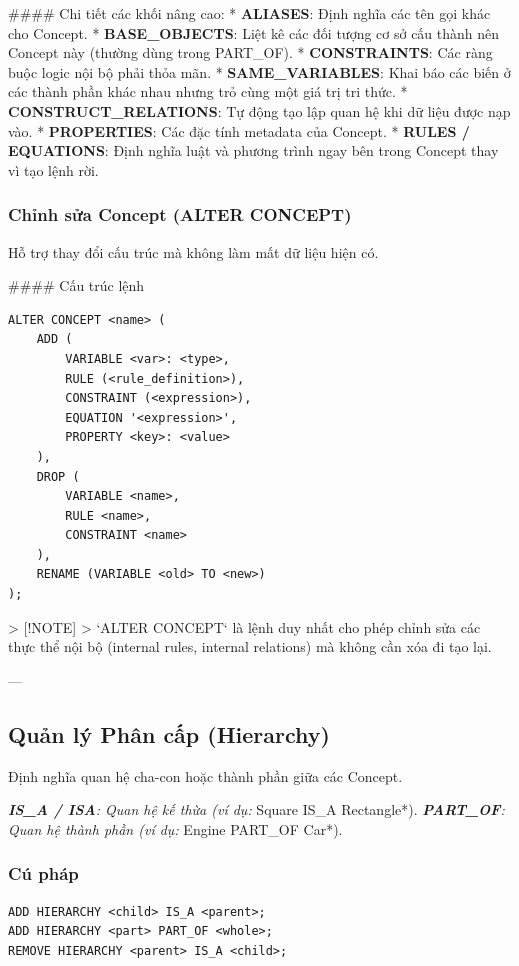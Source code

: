 \#\#\#\# Chi tiết các khối nâng cao:
*   \textbf{ALIASES}: Định nghĩa các tên gọi khác cho Concept.
*   \textbf{BASE\_OBJECTS}: Liệt kê các đối tượng cơ sở cấu thành nên Concept này (thường dùng trong PART\_OF).
*   \textbf{CONSTRAINTS}: Các ràng buộc logic nội bộ phải thỏa mãn.
*   \textbf{SAME\_VARIABLES}: Khai báo các biến ở các thành phần khác nhau nhưng trỏ cùng một giá trị tri thức.
*   \textbf{CONSTRUCT\_RELATIONS}: Tự động tạo lập quan hệ khi dữ liệu được nạp vào.
*   \textbf{PROPERTIES}: Các đặc tính metadata của Concept.
*   \textbf{RULES / EQUATIONS}: Định nghĩa luật và phương trình ngay bên trong Concept thay vì tạo lệnh rời.

\subsubsection{Chỉnh sửa Concept (ALTER CONCEPT)}
Hỗ trợ thay đổi cấu trúc mà không làm mất dữ liệu hiện có.

\#\#\#\# Cấu trúc lệnh
\begin{verbatim}
ALTER CONCEPT <name> (
    ADD (
        VARIABLE <var>: <type>,
        RULE (<rule_definition>),
        CONSTRAINT (<expression>),
        EQUATION '<expression>',
        PROPERTY <key>: <value>
    ),
    DROP (
        VARIABLE <name>,
        RULE <name>,
        CONSTRAINT <name>
    ),
    RENAME (VARIABLE <old> TO <new>)
);
\end{verbatim}

> [!NOTE]
> `ALTER CONCEPT` là lệnh duy nhất cho phép chỉnh sửa các thực thể nội bộ (internal rules, internal relations) mà không cần xóa đi tạo lại.

---

\subsection{Quản lý Phân cấp (Hierarchy)}

Định nghĩa quan hệ cha-con hoặc thành phần giữa các Concept.

\textit{   \textbf{IS\_A / ISA}: Quan hệ kế thừa (ví dụ: }Square IS\_A Rectangle*).
\textit{   \textbf{PART\_OF}: Quan hệ thành phần (ví dụ: }Engine PART\_OF Car*).

\subsubsection{Cú pháp}
\begin{verbatim}
ADD HIERARCHY <child> IS_A <parent>;
ADD HIERARCHY <part> PART_OF <whole>;
REMOVE HIERARCHY <parent> IS_A <child>;
\end{verbatim}

